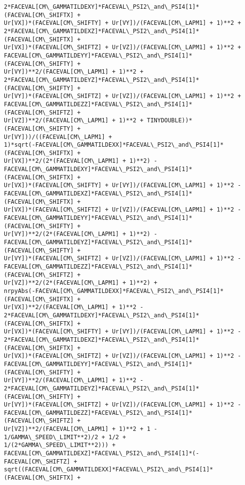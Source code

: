 \documentclass[landscape,letterpaper,10pt,english]{article}
\begin{document}
\begin{Verbatim}[commandchars=\\\{\}]
2*FACEVAL[CM\_GAMMATILDEXY]*FACEVAL\_PSI2\_and\_PSI4[1]*(FACEVAL[CM\_SHIFTX] +
Ur[VX])*(FACEVAL[CM\_SHIFTY] + Ur[VY])/(FACEVAL[CM\_LAPM1] + 1)**2 +
2*FACEVAL[CM\_GAMMATILDEXZ]*FACEVAL\_PSI2\_and\_PSI4[1]*(FACEVAL[CM\_SHIFTX] +
Ur[VX])*(FACEVAL[CM\_SHIFTZ] + Ur[VZ])/(FACEVAL[CM\_LAPM1] + 1)**2 +
FACEVAL[CM\_GAMMATILDEYY]*FACEVAL\_PSI2\_and\_PSI4[1]*(FACEVAL[CM\_SHIFTY] +
Ur[VY])**2/(FACEVAL[CM\_LAPM1] + 1)**2 +
2*FACEVAL[CM\_GAMMATILDEYZ]*FACEVAL\_PSI2\_and\_PSI4[1]*(FACEVAL[CM\_SHIFTY] +
Ur[VY])*(FACEVAL[CM\_SHIFTZ] + Ur[VZ])/(FACEVAL[CM\_LAPM1] + 1)**2 +
FACEVAL[CM\_GAMMATILDEZZ]*FACEVAL\_PSI2\_and\_PSI4[1]*(FACEVAL[CM\_SHIFTZ] +
Ur[VZ])**2/(FACEVAL[CM\_LAPM1] + 1)**2 + TINYDOUBLE))*(FACEVAL[CM\_SHIFTY] +
Ur[VY]))/((FACEVAL[CM\_LAPM1] +
1)*sqrt(-FACEVAL[CM\_GAMMATILDEXX]*FACEVAL\_PSI2\_and\_PSI4[1]*(FACEVAL[CM\_SHIFTX] +
Ur[VX])**2/(2*(FACEVAL[CM\_LAPM1] + 1)**2) -
FACEVAL[CM\_GAMMATILDEXY]*FACEVAL\_PSI2\_and\_PSI4[1]*(FACEVAL[CM\_SHIFTX] +
Ur[VX])*(FACEVAL[CM\_SHIFTY] + Ur[VY])/(FACEVAL[CM\_LAPM1] + 1)**2 -
FACEVAL[CM\_GAMMATILDEXZ]*FACEVAL\_PSI2\_and\_PSI4[1]*(FACEVAL[CM\_SHIFTX] +
Ur[VX])*(FACEVAL[CM\_SHIFTZ] + Ur[VZ])/(FACEVAL[CM\_LAPM1] + 1)**2 -
FACEVAL[CM\_GAMMATILDEYY]*FACEVAL\_PSI2\_and\_PSI4[1]*(FACEVAL[CM\_SHIFTY] +
Ur[VY])**2/(2*(FACEVAL[CM\_LAPM1] + 1)**2) -
FACEVAL[CM\_GAMMATILDEYZ]*FACEVAL\_PSI2\_and\_PSI4[1]*(FACEVAL[CM\_SHIFTY] +
Ur[VY])*(FACEVAL[CM\_SHIFTZ] + Ur[VZ])/(FACEVAL[CM\_LAPM1] + 1)**2 -
FACEVAL[CM\_GAMMATILDEZZ]*FACEVAL\_PSI2\_and\_PSI4[1]*(FACEVAL[CM\_SHIFTZ] +
Ur[VZ])**2/(2*(FACEVAL[CM\_LAPM1] + 1)**2) +
nrpyAbs(-FACEVAL[CM\_GAMMATILDEXX]*FACEVAL\_PSI2\_and\_PSI4[1]*(FACEVAL[CM\_SHIFTX] +
Ur[VX])**2/(FACEVAL[CM\_LAPM1] + 1)**2 -
2*FACEVAL[CM\_GAMMATILDEXY]*FACEVAL\_PSI2\_and\_PSI4[1]*(FACEVAL[CM\_SHIFTX] +
Ur[VX])*(FACEVAL[CM\_SHIFTY] + Ur[VY])/(FACEVAL[CM\_LAPM1] + 1)**2 -
2*FACEVAL[CM\_GAMMATILDEXZ]*FACEVAL\_PSI2\_and\_PSI4[1]*(FACEVAL[CM\_SHIFTX] +
Ur[VX])*(FACEVAL[CM\_SHIFTZ] + Ur[VZ])/(FACEVAL[CM\_LAPM1] + 1)**2 -
FACEVAL[CM\_GAMMATILDEYY]*FACEVAL\_PSI2\_and\_PSI4[1]*(FACEVAL[CM\_SHIFTY] +
Ur[VY])**2/(FACEVAL[CM\_LAPM1] + 1)**2 -
2*FACEVAL[CM\_GAMMATILDEYZ]*FACEVAL\_PSI2\_and\_PSI4[1]*(FACEVAL[CM\_SHIFTY] +
Ur[VY])*(FACEVAL[CM\_SHIFTZ] + Ur[VZ])/(FACEVAL[CM\_LAPM1] + 1)**2 -
FACEVAL[CM\_GAMMATILDEZZ]*FACEVAL\_PSI2\_and\_PSI4[1]*(FACEVAL[CM\_SHIFTZ] +
Ur[VZ])**2/(FACEVAL[CM\_LAPM1] + 1)**2 + 1 - 1/GAMMA\_SPEED\_LIMIT**2)/2 + 1/2 +
1/(2*GAMMA\_SPEED\_LIMIT**2))) +
FACEVAL[CM\_GAMMATILDEXZ]*FACEVAL\_PSI2\_and\_PSI4[1]*(-FACEVAL[CM\_SHIFTZ] +
sqrt((FACEVAL[CM\_GAMMATILDEXX]*FACEVAL\_PSI2\_and\_PSI4[1]*(FACEVAL[CM\_SHIFTX] +

\end{Verbatim}
\end{document}
